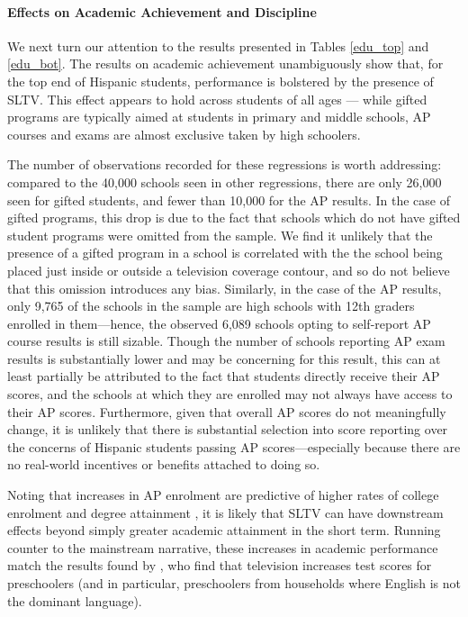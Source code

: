 \documentclass[11pt]{article}
\begin{document}
\paragraph{Effects on Academic Achievement and Discipline} 
We next turn our attention to the results presented in Tables \ref{edu_top} and \ref{edu_bot}. The results on academic achievement unambiguously show that, for the top end of Hispanic students, performance is bolstered by the presence of SLTV. This effect appears to hold across students of all ages --- while gifted programs are typically aimed at students in primary and middle schools, AP courses and exams are almost exclusive taken by high schoolers. 

 The number of observations recorded for these regressions is worth addressing: compared to the 40,000 schools seen in other regressions, there are only 26,000 seen for gifted students, and fewer than 10,000 for the AP results. In the case of gifted programs, this drop is due to the fact that schools which do not have gifted student programs were omitted from the sample. We find it unlikely that the presence of a gifted program in a school is correlated with the the school being placed just inside or outside a television coverage contour, and so do not believe that this omission introduces any bias. Similarly, in the case of the AP results, only 9,765 of the schools in the sample are high schools with 12th graders enrolled in them---hence, the observed 6,089 schools opting to self-report AP course results is still sizable. Though the number of schools reporting AP exam results is substantially lower and may be concerning for this result, this can at least partially be attributed to the fact that students directly receive their AP scores, and the schools at which they are enrolled may not always have access to their AP scores. Furthermore, given that overall AP scores do not meaningfully change, it is unlikely that there is substantial selection into score reporting over the concerns of Hispanic students passing AP scores---especially because there are no real-world incentives or benefits attached to doing so.

Noting that increases in AP enrolment are predictive of higher rates of college enrolment and degree attainment \citep{speroni_determinants_2011}, it is likely that SLTV can have downstream effects beyond simply greater academic attainment in the short term. Running counter to the mainstream narrative, these increases in academic performance match the results found by \cite{gentzkow_preschool_2008}, who find that television increases test scores for preschoolers (and in particular, preschoolers from households where English is not the dominant language).
\end{document}

